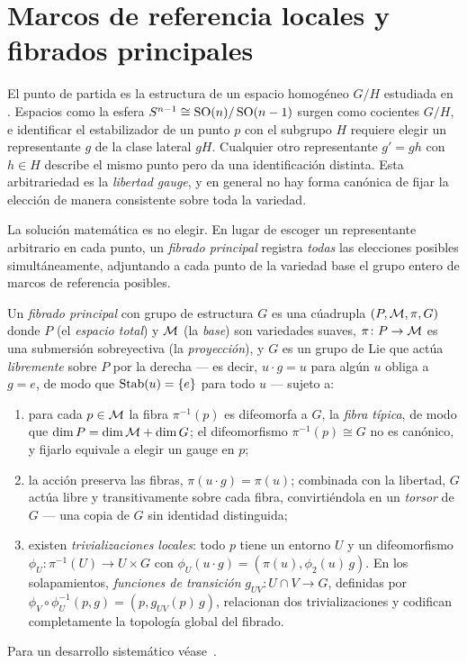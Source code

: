\section{Marcos de referencia locales y fibrados principales}
\label{sec:gauge:bundles}

El punto de partida es la estructura de un espacio homog\'eneo $G/H$ estudiada en
. Espacios como la esfera $S^{n-1} \cong \operatorname{SO}(n)/\operatorname{SO}(n-1)$
surgen como cocientes $G/H$, e identificar el estabilizador de un punto $p$ con
el subgrupo $H$ requiere elegir un representante $g$ de la clase lateral $gH$.
Cualquier otro representante $g' = gh$ con $h \in H$ describe el mismo punto pero
da una identificaci\'on distinta. Esta arbitrariedad es la \emph{libertad gauge},
y en general no hay forma can\'onica de fijar la elecci\'on de manera consistente
sobre toda la variedad.

La soluci\'on matem\'atica es no elegir. En lugar de escoger un representante
arbitrario en cada punto, un \emph{fibrado principal} registra \emph{todas} las
elecciones posibles simult\'aneamente, adjuntando a cada punto de la variedad
base el grupo entero de marcos de referencia posibles.

\begin{definition}
\label{def:gauge:principal-bundle}
Un \emph{fibrado principal} con grupo de estructura $G$ es una c\'uadrupla
$(P, \mathcal{M}, \pi, G)$ donde $P$ (el \emph{espacio total}) y $\mathcal{M}$ (la
\emph{base}) son variedades suaves, $\pi\colon P \to \mathcal{M}$ es una submersi\'on
sobreyectiva (la \emph{proyecci\'on}), y $G$ es un grupo de Lie que act\'ua
\emph{libremente} sobre $P$ por la derecha --- es decir, $u \cdot g = u$ para
alg\'un $u$ obliga a $g = e$, de modo que $\operatorname{Stab}(u) = \{e\}$ para todo $u$ ---
sujeto a:
\begin{enumerate}
  \item[(a)] para cada $p \in \mathcal{M}$ la fibra $\pi^{-1}(p)$ es difeomorfa a
    $G$, la \emph{fibra t\'ipica}, de modo que $\dim P = \dim \mathcal{M} + \dim G$; el
    difeomorfismo $\pi^{-1}(p) \cong G$ no es can\'onico, y fijarlo equivale a
    elegir un gauge en $p$;
  \item[(b)] la acci\'on preserva las fibras, $\pi(u \cdot g) = \pi(u)$;
    combinada con la libertad, $G$ act\'ua libre y transitivamente sobre cada
    fibra, convirti\'endola en un \emph{torsor} de $G$ --- una copia de $G$ sin
    identidad distinguida;
  \item[(c)] existen \emph{trivializaciones locales}: todo $p$ tiene un
    entorno $U$ y un difeomorfismo $\phi_U\colon \pi^{-1}(U) \to U \times
    G$ con $\phi_U(u \cdot g) = (\pi(u), \phi_2(u)\, g)$. En los solapamientos,
    \emph{funciones de transici\'on} $g_{UV}\colon U \cap V \to G$, definidas por
    $\phi_V \circ \phi_U^{-1}(p, g) = (p, g_{UV}(p)\, g)$, relacionan dos
    trivializaciones y codifican completamente la topolog\'ia global del fibrado.
\end{enumerate}
Para un desarrollo sistem\'atico v\'ease~\citep{Kobayashi1996}.
\end{definition}

